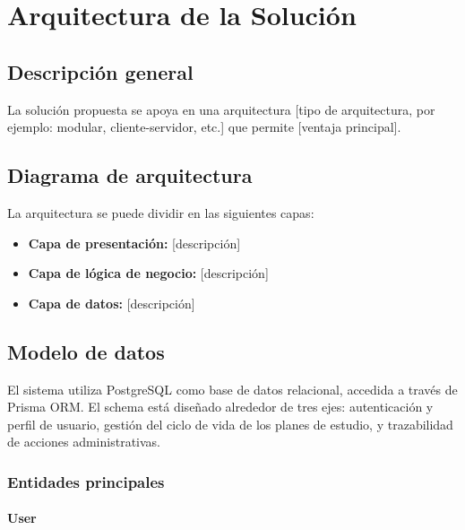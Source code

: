 \documentclass[12pt, a4paper]{report}
\begin{document}
\chapter{Arquitectura de la Solución}
\label{cap:arquitectura}

\section{Descripción general}

La solución propuesta se apoya en una arquitectura [tipo de arquitectura, por ejemplo:
modular, cliente-servidor, etc.] que permite [ventaja principal].

\section{Diagrama de arquitectura}


La arquitectura se puede dividir en las siguientes capas:

\begin{itemize}
  \item \textbf{Capa de presentación:} [descripción]
  \item \textbf{Capa de lógica de negocio:} [descripción]
  \item \textbf{Capa de datos:} [descripción]
\end{itemize}

\section{Modelo de datos}

El sistema utiliza PostgreSQL como base de datos relacional, accedida a través de Prisma
ORM. El schema está diseñado alrededor de tres ejes: autenticación y perfil de usuario,
gestión del ciclo de vida de los planes de estudio, y trazabilidad de acciones
administrativas.

\subsection{Entidades principales}

\subsubsection*{User}
\end{document}
